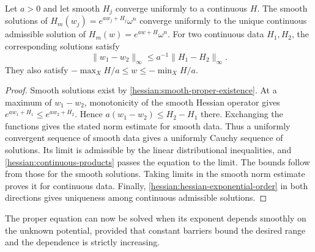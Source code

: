 
\begin{lemma}\label{draft631:proper-continuous-data}
Let $a>0$ and let smooth $H_j$ converge uniformly to a continuous
$H$. The smooth solutions of $H_m(w_j)=e^{aw_j+H_j}\omega^n$
converge uniformly to the unique continuous admissible solution of
$H_m(w)=e^{aw+H}\omega^n$. For two continuous data $H_1,H_2$,
the corresponding solutions satisfy
\[
 \|w_1-w_2\|_\infty\leq a^{-1}\|H_1-H_2\|_\infty.
\]
They also satisfy
$-\max_XH/a\leq w\leq-\min_XH/a$.
\end{lemma}
\begin{proof}
Smooth solutions exist by \cref{hessian:smooth-proper-existence}.
At a maximum of $w_1-w_2$, monotonicity of the smooth Hessian
operator gives $e^{aw_1+H_1}\leq e^{aw_2+H_2}$. Hence
$a(w_1-w_2)\leq H_2-H_1$ there. Exchanging the functions gives
the stated norm estimate for smooth data. Thus a uniformly
convergent sequence of smooth data gives a uniformly Cauchy
sequence of solutions. Its limit is admissible by the linear
distributional inequalities, and \cref{hessian:continuous-products}
passes the equation to the limit. The bounds follow from those
for the smooth solutions. Taking limits in the smooth norm estimate
proves it for continuous data. Finally,
\cref{hessian:hessian-exponential-order} in both directions gives
uniqueness among continuous admissible solutions.
\end{proof}

The proper equation can now be solved when its exponent depends
smoothly on the unknown potential, provided that constant barriers
bound the desired range and the dependence is strictly increasing.

